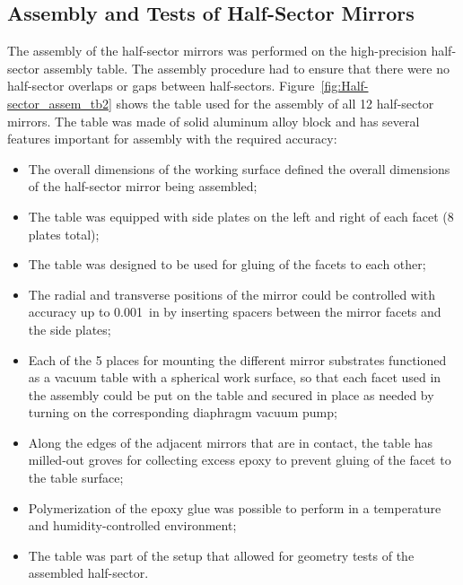 \subsection{Assembly and Tests of Half-Sector Mirrors}

The assembly of the half-sector mirrors was performed on the high-precision half-sector assembly table. The
assembly procedure had to ensure that there were no half-sector overlaps or gaps between half-sectors.
Figure~\ref{fig:Half-sector_assem_tb2} shows the table used for the assembly of all 12 half-sector mirrors. The
table was made of solid aluminum alloy block and has several features important for assembly with the required
accuracy:
\begin{itemize}
\item The overall dimensions of the working surface defined the overall dimensions of the half-sector mirror being
  assembled;
    \item The table was equipped with side plates on the left and right of each facet (8 plates total);
    \item The table was designed to be used for gluing of the facets to each other;
    \item The radial and transverse positions of the mirror could be controlled with accuracy up to 0.001~in by
      inserting spacers between the mirror facets and the side plates;
    \item Each of the 5 places for mounting the different mirror substrates functioned as a vacuum table with a
      spherical work surface, so that each  facet used in the assembly could  be put on the table and secured in place
      as needed by turning on the corresponding diaphragm vacuum pump;
    \item Along the edges of the adjacent mirrors that are in contact, the table has milled-out groves for collecting
      excess epoxy to prevent gluing of the facet to the table surface;
    \item Polymerization of the epoxy glue was possible to perform in a temperature and humidity-controlled
      environment;
    \item The table was part of the setup that allowed for geometry tests of the assembled half-sector.
\end{itemize}

